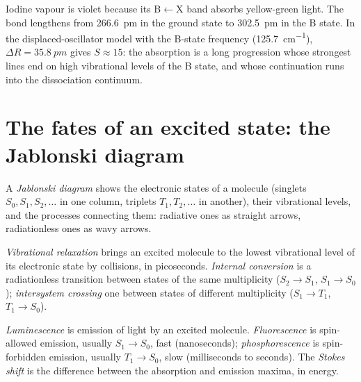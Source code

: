 \begin{example}[Iodine]\label{ex:b3:electronic-spectroscopy:iodine}
Iodine vapour is violet because its B$\leftarrow$X band absorbs yellow-green light.
The bond lengthens from \qty{266.6}{pm} in the ground state to \qty{302.5}{pm} in
the B state. In the displaced-oscillator model with the B-state frequency
(\qty{125.7}{cm^{-1}}), $\Delta R = \qty{35.8}{pm}$ gives $S \approx 15$: the absorption is a
long progression whose strongest lines end on high vibrational levels of the
B state, and whose continuation runs into the dissociation continuum.
\end{example}

\section{The fates of an excited state: the Jablonski diagram}

\begin{definition}\label{def:b3:electronic-spectroscopy:jablonski}
A \emph{Jablonski diagram} shows the electronic states
of a molecule (singlets $S_0, S_1, S_2, \dots$ in one column, triplets $T_1, T_2,
\dots$ in another), their vibrational levels, and the processes connecting them:
radiative ones as straight arrows, radiationless ones as wavy arrows.
\end{definition}

\begin{definition}\label{def:b3:electronic-spectroscopy:radiationless}
\emph{Vibrational relaxation} brings an excited
molecule to the lowest vibrational level of its electronic state by
collisions, in picoseconds. \emph{Internal conversion} is a radiationless transition between states of the same
multiplicity ($S_2 \to S_1$, $S_1 \to S_0$); \emph{intersystem
crossing} one between states of different
multiplicity ($S_1 \to T_1$, $T_1 \to S_0$).
\end{definition}

\begin{definition}\label{def:b3:electronic-spectroscopy:luminescence}
\emph{Luminescence} is emission of light by an excited
molecule. \emph{Fluorescence} is spin-allowed emission,
usually $S_1 \to S_0$, fast (nanoseconds); \emph{phosphorescence}
is spin-forbidden emission, usually $T_1 \to S_0$, slow (milliseconds to
seconds). The \emph{Stokes shift} is the difference between
the absorption and emission maxima, in energy.
\end{definition}

